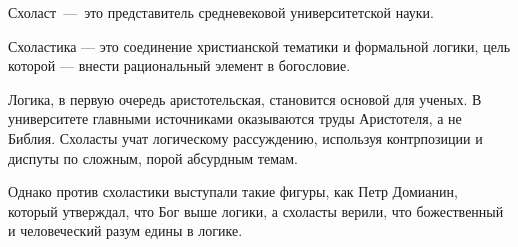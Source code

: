Схоласт~---~это представитель средневековой университетской науки.

Схоластика — это соединение христианской тематики и формальной логики, цель которой — внести рациональный элемент в богословие. 

Логика, в первую очередь аристотельская, становится основой для ученых. В университете главными источниками оказываются труды Аристотеля, а не Библия. Схоласты учат логическому рассуждению, используя контрпозиции и диспуты по сложным, порой абсурдным темам. 

Однако против схоластики выступали такие фигуры, как Петр Домианин, который утверждал, что Бог выше логики, а схоласты верили, что божественный и человеческий разум едины в логике.



